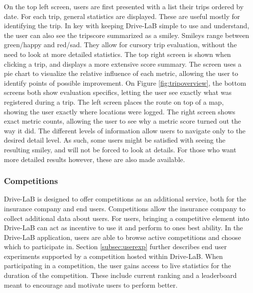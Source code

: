 On the top left screen, users are first presented with a list their trips ordered by date. For each trip, general statistics are displayed. These are useful mostly for identifying the trip. In key with keeping Drive-LaB simple to use and understand, the user can also see the tripscore summarized as a smiley. Smileys range between green/happy and red/sad. They allow for cursory trip evaluation, without the need to look at more detailed statistics.
The top right screen is shown when clicking a trip, and displays a more extensive score summary. The screen uses a pie chart to visualize the relative influence of each metric, allowing the user to identify points of possible improvement.
On Figure \ref{fig:tripoverview}, the bottom screens both show evaluation specifics, letting the user see exactly what was registered during a trip. The left screen places the route on top of a map, showing the user exactly where locations were logged. The right screen shows exact metric counts, allowing the user to see why a metric score turned out the way it did.
The different levels of information allow users to navigate only to the desired detail level. As such, some users might be satisfied with seeing the resulting smiley, and will not be forced to look at details. For those who want more detailed results however, these are also made available.

\subsubsection{Competitions} \label{subsubsec:competitions}
Drive-LaB is designed to offer competitions as an additional service, both for the insurance company and end users. Competitions allow the insurance company to collect additional data about users. For users, bringing a competitive element into Drive-LaB can act as incentive to use it and perform to ones best ability. In the Drive-LaB application, users are able to browse active competitions and choose which to participate in. Section \ref{subsec:userexp} further describes end user experiments supported by a competition hosted within Drive-LaB. When participating in a competition, the user gains access to live statistics for the duration of the competition. These include current ranking and a leaderboard meant to encourage and motivate users to perform better.